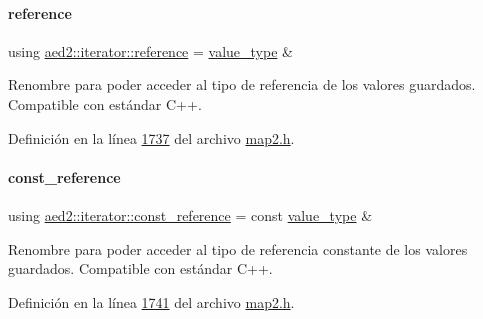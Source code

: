 \paragraph{\texorpdfstring{reference}{reference}}
{\footnotesize\ttfamily using \hyperlink{classaed2_1_1iterator_ad4ba975de35932c0cc8af3c25a6748bf_ad4ba975de35932c0cc8af3c25a6748bf}{aed2\+::iterator\+::reference} =  \hyperlink{classaed2_1_1iterator_a6411a2c08b2b7c52f063bef1a168acb6_a6411a2c08b2b7c52f063bef1a168acb6}{value\+\_\+type} \&}



Renombre para poder acceder al tipo de referencia de los valores guardados. Compatible con estándar C++. 



Definición en la línea \hyperlink{map2_8h_source_l01737}{1737} del archivo \hyperlink{map2_8h_source}{map2.\+h}.

\mbox{\label{classaed2_1_1iterator_a84dc2693b11216f8c641b5df59088283_a84dc2693b11216f8c641b5df59088283}} 
\paragraph{\texorpdfstring{const\+\_\+reference}{const\_reference}}
{\footnotesize\ttfamily using \hyperlink{classaed2_1_1iterator_a84dc2693b11216f8c641b5df59088283_a84dc2693b11216f8c641b5df59088283}{aed2\+::iterator\+::const\+\_\+reference} =  const \hyperlink{classaed2_1_1iterator_a6411a2c08b2b7c52f063bef1a168acb6_a6411a2c08b2b7c52f063bef1a168acb6}{value\+\_\+type} \&}



Renombre para poder acceder al tipo de referencia constante de los valores guardados. Compatible con estándar C++. 



Definición en la línea \hyperlink{map2_8h_source_l01741}{1741} del archivo \hyperlink{map2_8h_source}{map2.\+h}.

\mbox{\label{classaed2_1_1iterator_a07466e8d020a80e2deb80364f28d4fa0_a07466e8d020a80e2deb80364f28d4fa0}} 
